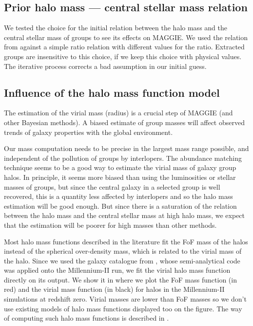 \subsection{Prior halo mass --- central stellar mass relation}
\label{sub:prior_relation}

We tested the choice for the initial relation between the halo mass and the
central stellar mass of groups to see its effects on MAGGIE\@. We used the
relation from \citet{BCW+10} against a simple ratio relation with different
values for the ratio. Extracted groups are insensitive to this choice, if we
keep this choice with physical values. The iterative process corrects a bad
assumption in our initial guess.

\subsection{Influence of the halo mass function model}
\label{sub:hmf_test}

The estimation of the virial mass (radius) is a crucial step of MAGGIE (and
other Bayesian methods). A biased estimate of group masses will affect observed
trends of galaxy properties with the global environment.

Our mass computation needs to be precise in the largest mass range possible,
and independent of the pollution of groups by interlopers. The abundance
matching technique seems to be a good way to estimate the virial mass of galaxy
group halos. In principle, it seems more biased than using the luminosities or
stellar masses of groups, but since the central galaxy in a selected group is
well recovered, this is a quantity less affected by interlopers and so the halo
mass estimation will be good enough. But since there is a saturation of the
relation between the halo mass and the central stellar mass at high halo mass,
we expect that the estimation will be poorer for high masses than other
methods.

Most halo mass functions described in the literature fit the FoF mass of the
halos instead of the spherical over-density mass, which is related to the
virial mass of the halo. Since we used the galaxy catalogue from
\citet{Guo+11}, whose semi-analytical code was applied onto the Millennium-II
run, we fit the virial halo mass function directly on its output. We show it in
 where we plot the FoF mass function (in red) and the virial
mass function (in black) for halos in the Millennium-II simulations at redshift
zero. Virial masses are lower than FoF masses so we don't use existing models
of halo mass functions displayed too on the figure. The way of computing such
halo mass functions is described in .

